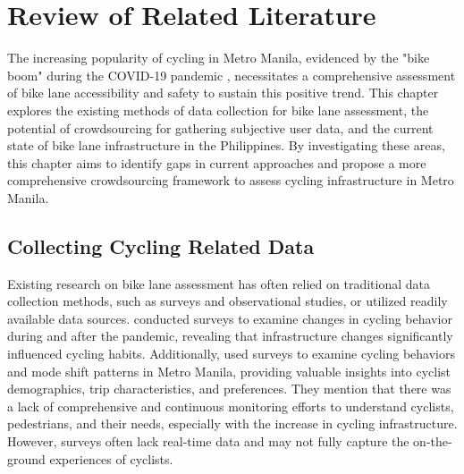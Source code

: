 %
%
%                 
\newcommand{\coo}{\ensuremath{\mathrm{CO_2}}}
\newcommand{\cooo}{CO\textsubscript{2}}

\chapter{Review of Related Literature}
\label{sec:relatedlit}

The increasing popularity of cycling in Metro Manila, evidenced by the "bike boom" during the COVID-19 pandemic \citep{Younes:2023}, necessitates a comprehensive assessment of bike lane accessibility and safety to sustain this positive trend. This chapter explores the existing methods of data collection for bike lane assessment, the potential of crowdsourcing for gathering subjective user data, and the current state of bike lane infrastructure in the Philippines. By investigating these areas, this chapter aims to identify gaps in current approaches and propose a more comprehensive crowdsourcing framework to assess cycling infrastructure in Metro Manila.


\section{Collecting Cycling Related Data}


Existing research on bike lane assessment has often relied on traditional data collection methods, such as surveys and observational studies, or utilized readily available data sources. \citet{Younes:2023} conducted surveys to examine changes in cycling behavior during and after the pandemic, revealing that infrastructure changes significantly influenced cycling habits.  Additionally, \citet{Gaspay:2022} used surveys to examine cycling behaviors and mode shift patterns in Metro Manila, providing valuable insights into cyclist demographics, trip characteristics, and preferences.  They mention that there was a lack of comprehensive and continuous monitoring efforts to understand cyclists, pedestrians, and their needs, especially with the increase in cycling infrastructure. However, surveys often lack real-time data and may not fully capture the on-the-ground experiences of cyclists. 

